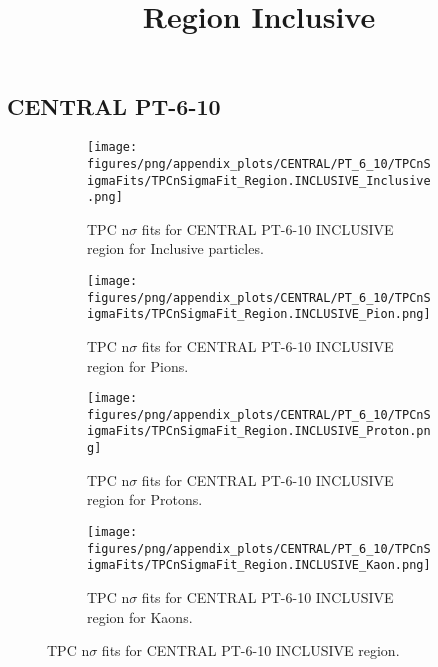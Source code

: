             \subsection{CENTRAL PT-6-10}
            \begin{figure}[H]
                \title{Region Inclusive}
                \begin{subfigure}[b]{0.5\textwidth}
                    \centering
                    \texttt{[image: figures/png/appendix\_plots/CENTRAL/PT\_6\_10/TPCnSigmaFits/TPCnSigmaFit\_Region.INCLUSIVE\_Inclusive.png]}
                    \caption{TPC n$\sigma$ fits for CENTRAL PT-6-10 INCLUSIVE region for Inclusive particles.}
                    \label{fig:appendix_CENTRAL_PT-6-10_INCLUSIVE_Inclusive}
                \end{subfigure}
                \begin{subfigure}[b]{0.5\textwidth}
                    \centering
                    \texttt{[image: figures/png/appendix\_plots/CENTRAL/PT\_6\_10/TPCnSigmaFits/TPCnSigmaFit\_Region.INCLUSIVE\_Pion.png]}
                    \caption{TPC n$\sigma$ fits for CENTRAL PT-6-10 INCLUSIVE region for Pions.}
                    \label{fig:appendix_CENTRAL_PT-6-10_INCLUSIVE_Pion}
                \end{subfigure}
                \begin{subfigure}[b]{0.5\textwidth}
                    \centering
                    \texttt{[image: figures/png/appendix\_plots/CENTRAL/PT\_6\_10/TPCnSigmaFits/TPCnSigmaFit\_Region.INCLUSIVE\_Proton.png]}
                    \caption{TPC n$\sigma$ fits for CENTRAL PT-6-10 INCLUSIVE region for Protons.}
                    \label{fig:appendix_CENTRAL_PT-6-10_INCLUSIVE_Proton}
                \end{subfigure}
                \begin{subfigure}[b]{0.5\textwidth}
                    \centering
                    \texttt{[image: figures/png/appendix\_plots/CENTRAL/PT\_6\_10/TPCnSigmaFits/TPCnSigmaFit\_Region.INCLUSIVE\_Kaon.png]}
                    \caption{TPC n$\sigma$ fits for CENTRAL PT-6-10 INCLUSIVE region for Kaons.}
                    \label{fig:appendix_CENTRAL_PT-6-10_INCLUSIVE_Kaon}
                \end{subfigure}
                \caption{TPC n$\sigma$ fits for CENTRAL PT-6-10 INCLUSIVE region.}
                \label{fig:appendix_CENTRAL_PT-6-10_INCLUSIVE}
            \end{figure}
